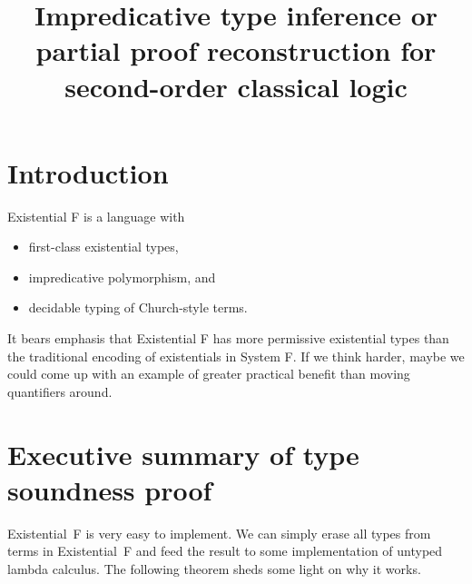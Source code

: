 \documentclass{amsart}
\title
[Impredicative type inference]
{
Impredicative type inference
\break
or
\break
partial proof reconstruction \break
for second-order classical logic
}
\begin{document}
\newcommand{\nc}{\newcommand}
\newcommand{\DotExpr}[2]{#1 #2.\ }
\nc\Abs    {\DotExpr\lambda}
\nc\All    {\DotExpr\forall}
\nc\Allin  {\forall\mathrm{in}}
\nc\Allex  {\forall\mathrm{ex}}
\nc\Abort  {\mathrm{abort}}
\nc\AbortCC{\mathrm{abort/cc}}
\nc\ApplyCC{\mathrm{apply/cc}}
\def\Box   {\mathrm{box}}
\nc\Brouwer{\operatorname{Brouwer}}
\nc\Case   {}
\nc\Cps    {\operatorname{cps}}
\nc\Dn[1]  {(#1 \R \bot) \R \bot}
\nc\Dni    {\mathrm{\neg\neg I}}
\nc\Erase  {\mathrm{erase}}
\nc\Ex     {\DotExpr\exists}
\nc\Exin   {\exists\mathrm{in}}
\nc\Exex   {\exists\mathrm{ex}}
\nc\FV     {\operatorname{FV}}
\nc\Id     {\mathit{id}}
\nc\Indent {\hspace{3em}}
\nc\Mgsr   {\operatorname{mgsr}}
\nc\Or     {\ | \ }
\nc\Prune  {\operatorname{prune}}
\nc\Recall {\DotExpr\Xi} %
\nc\Redo   {\operatorname{redo}}
\nc\Tabs   {\DotExpr\Lambda}
\nc\R      {\rightarrow}
\nc\Unbox  {\mathrm{unbox}}
\nc\Undo   {\operatorname{undo}}
\nc\Unify  {\operatorname{unify}}
\maketitle
\tableofcontents

\section{Introduction}

Existential F is a language with
\begin{itemize}
\item first-class existential types,
\item impredicative polymorphism, and
\item decidable typing of Church-style terms.
\end{itemize}
It bears emphasis that Existential F has more permissive
existential types than the traditional encoding of existentials
in System F. If we think harder, maybe we could come up with an
example of greater practical benefit than moving quantifiers
around.

\section{Executive summary of type soundness proof}
\label{sec:exe}

Existential~F is very easy to implement. We can simply erase all
types from terms in Existential~F and feed the result to some
implementation of untyped lambda calculus. The following theorem
sheds some light on why it works.
\end{document}
